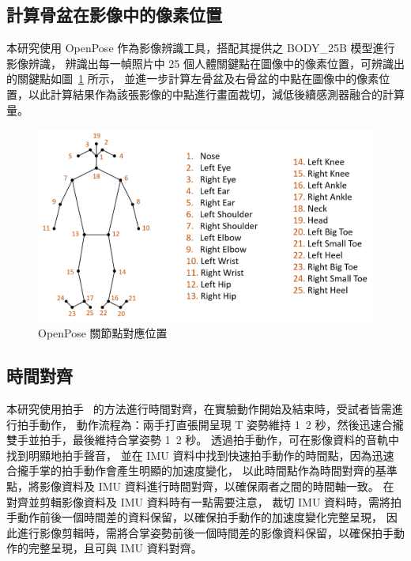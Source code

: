 \subsection{計算骨盆在影像中的像素位置}
本研究使用 OpenPose 作為影像辨識工具，搭配其提供之 BODY\_25B 模型進行影像辨識，
辨識出每一幀照片中 25 個人體關鍵點在圖像中的像素位置，可辨識出的關鍵點如圖~\ref{ch3_fig_OpenPose} 所示，
並進一步計算左骨盆及右骨盆的中點在圖像中的像素位置，以此計算結果作為該張影像的中點進行畫面裁切，減低後續感測器融合的計算量。

\begin{figure}[!ht]
   \centering
   \includegraphics[width=\linewidth]{figure/ch3_fig_OpenPose.png}
    \caption[OpenPose 關節點對應位置]{OpenPose 關節點對應位置}
    \label{ch3_fig_OpenPose}
\end{figure}

\subsection{時間對齊}
本研究使用拍手~\cite{pons2012data} 的方法進行時間對齊，在實驗動作開始及結束時，受試者皆需進行拍手動作，
動作流程為：兩手打直張開呈現 T 姿勢維持 1~2 秒，然後迅速合攏雙手並拍手，最後維持合掌姿勢 1~2 秒。
透過拍手動作，可在影像資料的音軌中找到明顯地拍手聲音，
並在 IMU 資料中找到快速拍手動作的時間點，因為迅速合攏手掌的拍手動作會產生明顯的加速度變化，
以此時間點作為時間對齊的基準點，將影像資料及 IMU 資料進行時間對齊，以確保兩者之間的時間軸一致。
在對齊並剪輯影像資料及 IMU 資料時有一點需要注意，
裁切 IMU 資料時，需將拍手動作前後一個時間差的資料保留，以確保拍手動作的加速度變化完整呈現，
因此進行影像剪輯時，需將合掌姿勢前後一個時間差的影像資料保留，以確保拍手動作的完整呈現，且可與 IMU 資料對齊。

